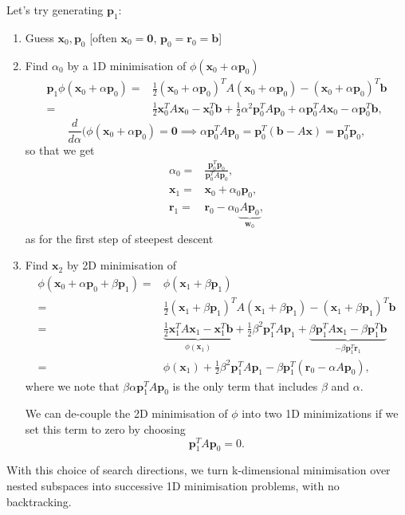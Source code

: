 \documentclass[12pt, a4paper]{article}
\renewcommand{\vec}[1]{\mathbf{#1}}
\theoremstyle{definition}
\theoremstyle{remark}
\numberwithin{equation}{section}
\begin{document}
Let's try generating $ \vec{p}_1$:
\begin{enumerate}
\item  Guess $\vec{x}_0, \vec{p}_0$ [often $\vec{x}_0=\vec{0}$, $\vec{p}_0 = \vec{r}_0 =\vec{b}$]
\item Find $\alpha_0$ by a 1D minimisation of $\phi(\vec{x}_0+\alpha \vec{p}_0)$
\begin{align*}\vec{p}_1
\phi(\vec{x}_0 + \alpha \vec{p}_0) =& \frac{1}{2} (\vec{x}_0+\alpha \vec{p}_0)^T A (\vec{x}_0 + \alpha \vec{p}_0) - (\vec{x}_0 + \alpha \vec{p}_0)^T \vec{b}\\
=& \frac{1}{2}\vec{x}_0^TA \vec{x}_0 - \vec{x}_0^T \vec{b} + \frac{1}{2} \alpha^2 \vec{p}_0^T A \vec{p}_0 + \alpha \vec{p}_0^T A \vec{x}_0 - \alpha \vec{p}_0^T \vec{b},
\end{align*}
\begin{equation*}
\frac{d}{d \alpha}(\phi(\vec{x}_0 + \alpha \vec{p}_0) =\vec{0} \implies \alpha \vec{p}_0^T A \vec{p}_0 = \vec{p}_0^T(\vec{b}-A\vec{x}) = \vec{p}_0^T \vec{p}_0,
\end{equation*}
so that we get
\begin{align*}
\alpha_0 =& \frac{\vec{p}_0^T \vec{p}_0}{\vec{p}_0^T A \vec{p}_0},\\
\vec{x}_1 =& \vec{x}_0 + \alpha_0 \vec{p}_0,\\
\vec{r}_1 =& \vec{r}_0 - \alpha_0 \underbrace{A\vec{p}_0}_{\vec{w}_0},
\end{align*}
as for the first step of steepest descent%
\item Find $\vec{x}_2$ by 2D minimisation of
\begin{align*}
\phi(\vec{x}_0 + \alpha \vec{p}_0 + \beta \vec{p}_1) =& \phi(\vec{x}_1 + \beta \vec{p}_1)\\
=&\frac{1}{2}(\vec{x}_1 + \beta \vec{p}_1)^T A (\vec{x}_1 + \beta \vec{p}_1) - (\vec{x}_1 + \beta \vec{p}_1)^T \vec{b}\\
=& \underbrace{\frac{1}{2}\vec{x}_1^TA\vec{x}_1 - \vec{x}_1^T\vec{b}}_{\phi(\vec{x}_1)} + \frac{1}{2} \beta^2 \vec{p}_1^T A \vec{p}_1 + \underbrace{\beta \vec{p}_1^T A \vec{x}_1 - \beta \vec{p}_1^T \vec{b}}_{-\beta \vec{p}_1^T\vec{r}_1}\\
=&\phi(\vec{x}_1) + \frac{1}{2} \beta^2 \vec{p}_1^T A \vec{p}_1 - \beta \vec{p}_1^T(\vec{r}_0 - \alpha A \vec{p}_0),
\end{align*}
where we note that $\beta\alpha \vec{p}_1^TA\vec{p}_0$ is the only term that includes $\beta$ and $\alpha$. 

We can de-couple the 2D minimisation of $\phi$ into two 1D minimizations if we set  this term to zero by choosing
\[\vec{p}_1^TA\vec{p}_0=0.\] 
\end{enumerate}
With this choice of search directions, we turn k-dimensional minimisation over nested subspaces into successive 1D minimisation problems, with no backtracking.
\end{document}
